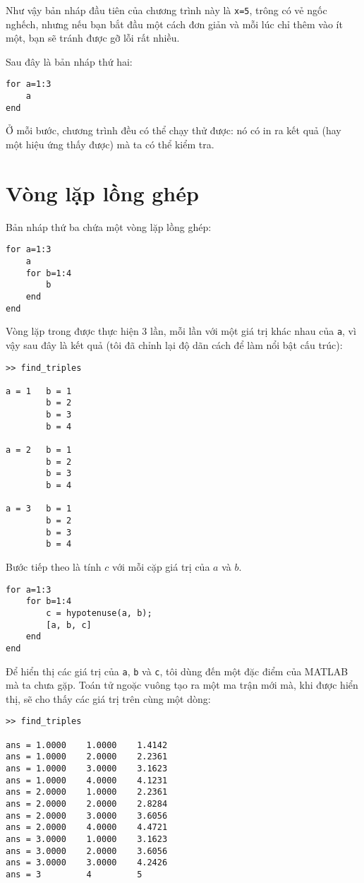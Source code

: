 \documentclass[12pt]{book}
\begin{document}
Như vậy bản nháp đầu tiên của chương trình này là {\tt x=5}, 
trông có vẻ ngốc nghếch, nhưng nếu bạn bắt đầu một cách đơn giản và
mỗi lúc chỉ thêm vào ít một, bạn sẽ tránh được gỡ lỗi rất nhiều.

Sau đây là bản nháp thứ hai:

\begin{verbatim}
for a=1:3
    a
end
\end{verbatim}

Ở mỗi bước, chương trình đều có thể chạy thử được: nó có in ra kết quả
(hay một hiệu ứng thấy được) mà ta có thể kiểm tra.


\section{Vòng lặp lồng ghép}

Bản nháp thứ ba chứa một vòng lặp lồng ghép:

\begin{verbatim}
for a=1:3
    a
    for b=1:4
        b
    end
end
\end{verbatim}

Vòng lặp trong được thực hiện 3 lần, mỗi lần với một giá trị 
khác nhau của {\tt a}, vì vậy sau đây là kết quả (tôi đã chỉnh
lại độ dãn cách để làm nổi bật cấu trúc):

\begin{verbatim}
>> find_triples

a = 1   b = 1
        b = 2
        b = 3
        b = 4

a = 2   b = 1
        b = 2
        b = 3
        b = 4

a = 3   b = 1
        b = 2
        b = 3
        b = 4
\end{verbatim}

Bước tiếp theo là tính $c$ với mỗi cặp giá trị của $a$ và $b$.

\begin{verbatim}
for a=1:3
    for b=1:4
        c = hypotenuse(a, b);
        [a, b, c]
    end
end
\end{verbatim}

Để hiển thị các giá trị của {\tt a}, {\tt b} và {\tt c}, tôi
dùng đến một đặc điểm của MATLAB mà ta chưa gặp. Toán tử
ngoặc vuông tạo ra một ma trận mới mà, khi được hiển thị, sẽ
cho thấy các giá trị trên cùng một dòng:

\begin{verbatim}
>> find_triples

ans = 1.0000    1.0000    1.4142
ans = 1.0000    2.0000    2.2361
ans = 1.0000    3.0000    3.1623
ans = 1.0000    4.0000    4.1231
ans = 2.0000    1.0000    2.2361
ans = 2.0000    2.0000    2.8284
ans = 2.0000    3.0000    3.6056
ans = 2.0000    4.0000    4.4721
ans = 3.0000    1.0000    3.1623
ans = 3.0000    2.0000    3.6056
ans = 3.0000    3.0000    4.2426
ans = 3         4         5
\end{verbatim}
\end{document}
